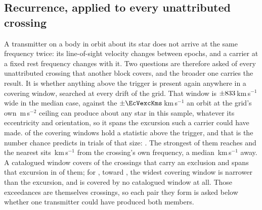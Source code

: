 \subsection{Recurrence, applied to every unattributed crossing}
\label{sec:etacrv}

A transmitter on a body in orbit about its star does not arrive at the same
frequency twice: its line-of-sight velocity changes between epochs, and a
carrier at a fixed rest frequency changes with it. Two questions are therefore
asked of every unattributed crossing that another block covers, and the
broader one carries the result. It is whether anything above the trigger is
present again anywhere in a covering window, searched at every drift of the
grid. That window is $\pm833$\,km\,s$^{-1}$ wide in the median case,
against the $\pm\EcVexcKms$\,km\,s$^{-1}$ an orbit at the grid's own
\WdAGrid\,m\,s$^{-2}$ ceiling can produce about any star in this sample,
whatever its eccentricity and orientation, so it spans the excursion such a
carrier could have made. \WdNExc{} of the \WdNCov{} covering windows hold a
statistic above the trigger, and that is the number chance predicts in trials
of that size: \WdExpect. The strongest of them reaches \WdExcMax{} and the
nearest sits \WdNearKms\,km\,s$^{-1}$ from the crossing's own frequency, a
median \WdMedKms\,km\,s$^{-1}$ away. A catalogued window covers \WdNOrbTot{} of the
\RcNExcl{} crossings that carry an exclusion and spans that excursion in
\EcNSpan{} of them; for \EcNShort, toward \EcShortStarList, the widest
covering window is narrower than the excursion, and \WdNNoCov{} is covered by
no catalogued window at all. Those exceedances are themselves crossings, so
each pair they form is asked below whether one transmitter could have produced
both members.

